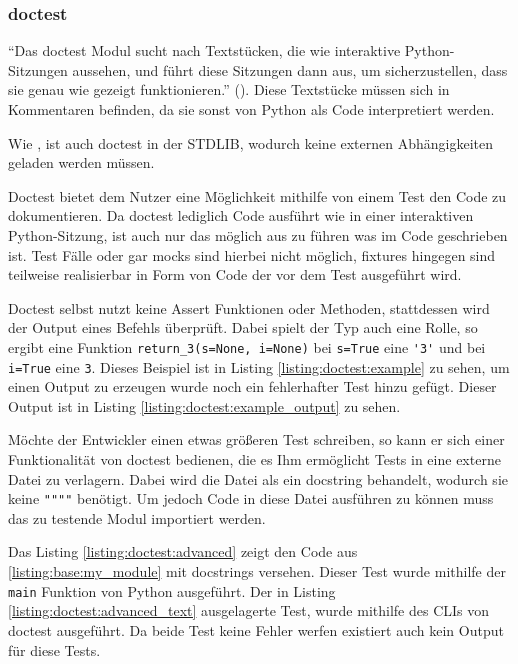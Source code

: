 \subsubsection{doctest}\label{python-tools:doctest}

"`Das doctest Modul sucht nach Textstücken, die wie interaktive Python-Sitzungen aussehen, und führt diese Sitzungen dann aus, um sicherzustellen, dass sie genau wie gezeigt funktionieren."' (\cite{docs.python:doctest}). Diese Textstücke müssen sich in Kommentaren befinden, da sie
sonst von Python als Code interpretiert werden.

Wie , ist auch doctest in der STDLIB, wodurch keine externen
Abhängigkeiten geladen werden müssen.

Doctest bietet dem Nutzer eine Möglichkeit mithilfe von einem Test den Code zu dokumentieren.
Da doctest lediglich Code ausführt wie in einer interaktiven Python-Sitzung, ist auch nur
das möglich aus zu führen was im Code geschrieben ist. Test Fälle oder gar \Glspl{mock} sind 
hierbei nicht möglich, \Glspl{fixture} hingegen sind teilweise realisierbar in Form von Code der
vor dem Test ausgeführt wird.

Doctest selbst nutzt keine Assert Funktionen oder Methoden, stattdessen wird der Output eines
Befehls überprüft. Dabei spielt der Typ auch eine Rolle, so ergibt eine Funktion
\lstinline{return_3(s=None, i=None)} bei \lstinline{s=True} eine \lstinline{'3'} und bei
\lstinline{i=True} eine \lstinline{3}. Dieses Beispiel ist in Listing \ref{listing:doctest:example}
zu sehen, um einen Output zu erzeugen wurde noch ein fehlerhafter Test hinzu gefügt. Dieser Output
ist in Listing \ref{listing:doctest:example_output} zu sehen.

Möchte der Entwickler einen etwas größeren Test schreiben, so kann er sich einer Funktionalität
von doctest bedienen, die es Ihm ermöglicht Tests in eine externe Datei zu verlagern. Dabei
wird die Datei als ein \Gls{docstring} behandelt, wodurch sie keine \lstinline{""""} benötigt.
Um jedoch Code in diese Datei ausführen zu können muss das zu testende Modul importiert werden.

Das Listing \ref{listing:doctest:advanced} zeigt den Code aus \ref{listing:base:my_module} mit
\Glspl{docstring} versehen. Dieser Test wurde mithilfe der \lstinline{main} Funktion von Python
ausgeführt. Der in Listing \ref{listing:doctest:advanced_text} ausgelagerte Test, wurde mithilfe
des CLIs von doctest ausgeführt. Da beide Test keine Fehler werfen existiert auch kein Output
für diese Tests.

